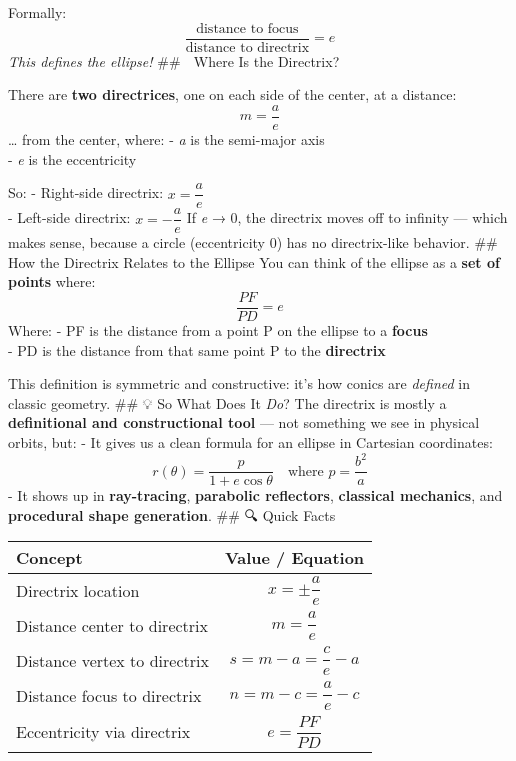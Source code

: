 \documentclass[
  letterpaper,
]{book}
\begin{document}
Formally:
\[\dfrac{\text{distance to focus}}{\text{distance to directrix}} = e\]
\emph{This defines the ellipse!} \#\# 📏 Where Is the Directrix?

There are \textbf{two directrices}, one on each side of the center, at a
distance: \[m = \dfrac{a}{e}\] \ldots{} from the center, where: -
\emph{a} is the semi-major axis\\
- \emph{e} is the eccentricity

So: - Right-side directrix: \(x = \dfrac{a}{e}\)\\
- Left-side directrix: \(x = -\dfrac{a}{e}\)\hspace{0pt} If \emph{e} →
0, the directrix moves off to infinity --- which makes sense, because a
circle (eccentricity 0) has no directrix-like behavior. \#\# 🎯 How the
Directrix Relates to the Ellipse You can think of the ellipse as a
\textbf{set of points} where: \[\dfrac{PF}{PD} = e\] Where: - PF is the
distance from a point P on the ellipse to a \textbf{focus}\\
- PD is the distance from that same point P to the \textbf{directrix}

This definition is symmetric and constructive: it's how conics are
\emph{defined} in classic geometry. \#\# 💡 So What Does It \emph{Do}?
The directrix is mostly a \textbf{definitional and constructional tool}
--- not something we see in physical orbits, but: - It gives us a clean
formula for an ellipse in Cartesian coordinates:
\[r(\theta) = \dfrac{p}{1 + e \cos \theta} \quad \text{where } p = \dfrac{b^2}{a}\]
- It shows up in \textbf{ray-tracing}, \textbf{parabolic reflectors},
\textbf{classical mechanics}, and \textbf{procedural shape generation}.
\#\# 🔍 Quick Facts

\begin{longtable}[]{@{}lc@{}}
\toprule\noalign{}
Concept & Value / Equation \\
\midrule\noalign{}
\endhead
\bottomrule\noalign{}
\endlastfoot
Directrix location & \(x= \pm \dfrac{a}{e}\)\hspace{0pt} \\
Distance center to directrix & \(m = \dfrac{a}{e}\)\hspace{0pt} \\
Distance vertex to directrix & \(s = m - a = \dfrac{c}{e}-a\) \\
Distance focus to directrix & \(n = m - c = \dfrac{a}{e} - c\) \\
Eccentricity via directrix & \(e = \dfrac{PF}{PD}\)\hspace{0pt} \\
\end{longtable}
\end{document}

